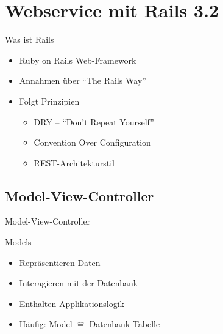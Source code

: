 

\section[Webservice]{Webservice mit Rails 3.2}

\begin{frame}{Was ist Rails}
  \begin{itemize}
    \item Ruby on Rails Web-Framework
    \item Annahmen über \enquote{The Rails Way}
    \item Folgt Prinzipien
    \begin{itemize}
      \item DRY -- \enquote{Don’t Repeat Yourself}
      \item Convention Over Configuration
      \item REST-Architekturstil
    \end{itemize}
  \end{itemize}
\end{frame}

\subsection{Model-View-Controller}

\begin{frame}[fragile]{Model-View-Controller}
  \begin{center}
    
  \end{center}
\end{frame}

\begin{frame}{Models}
  \begin{itemize}
    \item Repräsentieren Daten
    \item Interagieren mit der Datenbank
    \item Enthalten Applikationslogik
    \item Häufig: Model $\hat =$ Datenbank-Tabelle
  \end{itemize}
\end{frame}

